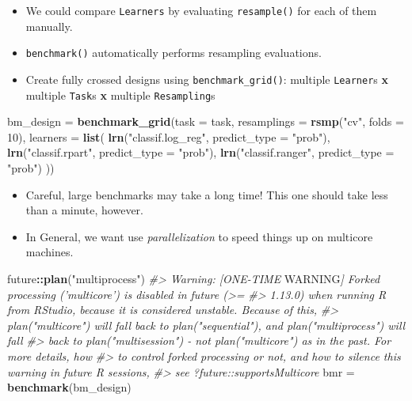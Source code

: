 \documentclass[]{article}
\newenvironment{Shaded}{\begin{snugshade}}{\end{snugshade}}
\newcommand{\AlertTok}[1]{\textcolor[rgb]{0.94,0.16,0.16}{#1}}
\newcommand{\CommentTok}[1]{\textcolor[rgb]{0.56,0.35,0.01}{\textit{#1}}}
\newcommand{\DataTypeTok}[1]{\textcolor[rgb]{0.13,0.29,0.53}{#1}}
\newcommand{\DecValTok}[1]{\textcolor[rgb]{0.00,0.00,0.81}{#1}}
\newcommand{\KeywordTok}[1]{\textcolor[rgb]{0.13,0.29,0.53}{\textbf{#1}}}
\newcommand{\NormalTok}[1]{#1}
\newcommand{\OperatorTok}[1]{\textcolor[rgb]{0.81,0.36,0.00}{\textbf{#1}}}
\newcommand{\StringTok}[1]{\textcolor[rgb]{0.31,0.60,0.02}{#1}}
\providecommand{\tightlist}{%
  \setlength{\itemsep}{0pt}\setlength{\parskip}{0pt}}
\begin{document}
\begin{itemize}
\tightlist
\item
  We could compare \texttt{Learners} by evaluating \texttt{resample()}
  for each of them manually.
\item
  \texttt{benchmark()} automatically performs resampling evaluations.
\item
  Create fully crossed designs using \texttt{benchmark\_grid()}:
  multiple \texttt{Learner}s \textbf{x} multiple \texttt{Task}s
  \textbf{x} multiple \texttt{Resampling}s
\end{itemize}

\begin{Shaded}
\begin{Highlighting}[]
\NormalTok{bm_design =}\StringTok{ }\KeywordTok{benchmark_grid}\NormalTok{(}\DataTypeTok{task =}\NormalTok{ task, }\DataTypeTok{resamplings =} \KeywordTok{rsmp}\NormalTok{(}\StringTok{"cv"}\NormalTok{, }\DataTypeTok{folds =} \DecValTok{10}\NormalTok{),}
  \DataTypeTok{learners =} \KeywordTok{list}\NormalTok{(}
      \KeywordTok{lrn}\NormalTok{(}\StringTok{"classif.log_reg"}\NormalTok{, }\DataTypeTok{predict_type =} \StringTok{"prob"}\NormalTok{),}
      \KeywordTok{lrn}\NormalTok{(}\StringTok{"classif.rpart"}\NormalTok{, }\DataTypeTok{predict_type =} \StringTok{"prob"}\NormalTok{),}
      \KeywordTok{lrn}\NormalTok{(}\StringTok{"classif.ranger"}\NormalTok{, }\DataTypeTok{predict_type =} \StringTok{"prob"}\NormalTok{)}
\NormalTok{  ))}
\end{Highlighting}
\end{Shaded}

\begin{itemize}
\tightlist
\item
  Careful, large benchmarks may take a long time! This one should take
  less than a minute, however.
\item
  In General, we want use \emph{parallelization} to speed things up on
  multicore machines.
\end{itemize}

\begin{Shaded}
\begin{Highlighting}[]
\NormalTok{future}\OperatorTok{::}\KeywordTok{plan}\NormalTok{(}\StringTok{"multiprocess"}\NormalTok{)}
\CommentTok{#> Warning: [ONE-TIME }\AlertTok{WARNING}\CommentTok{] Forked processing ('multicore') is disabled in future (>=}
\CommentTok{#> 1.13.0) when running R from RStudio, because it is considered unstable. Because of this,}
\CommentTok{#> plan("multicore") will fall back to plan("sequential"), and plan("multiprocess") will fall}
\CommentTok{#> back to plan("multisession") - not plan("multicore") as in the past. For more details, how}
\CommentTok{#> to control forked processing or not, and how to silence this warning in future R sessions,}
\CommentTok{#> see ?future::supportsMulticore}
\NormalTok{bmr =}\StringTok{ }\KeywordTok{benchmark}\NormalTok{(bm_design)}
\end{Highlighting}
\end{Shaded}
\end{document}
